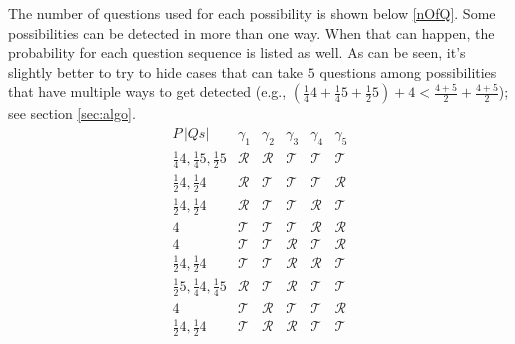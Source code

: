 \documentclass[twoside,twocolumn,a4paper,11pt]{article}
\theoremstyle{definition}
\begin{document}
The number of questions used for each possibility is shown below \eqref{nOfQ}.
Some possibilities can be detected in more than one way.
When that can happen, 
the probability for each
question sequence is listed as well.
As can be seen, it's slightly better to try to hide
cases that can take $5$ questions among possibilities that have multiple ways to get detected
(e.g., $(\frac{1}{4}4+\frac{1}{4}5+\frac{1}{2}5) + 4 < \frac{4+5}{2}+\frac{4+5}{2}$);
see section \ref{sec:algo}.
\vspace{-0.2em}
\begin{equation}
\label{nOfQ}
 \begin{matrix}
  P\,|Qs| & \gamma_1    & \gamma_2    & \gamma_3    & \gamma_4    & \gamma_5    \\
  \frac{1}{4}4,\frac{1}{4}5,\frac{1}{2}5
          & \mathcal{R} & \mathcal{R} & \mathcal{T} & \mathcal{T} & \mathcal{T} \\
  \frac{1}{2}4,\frac{1}{2}4
          & \mathcal{R} & \mathcal{T} & \mathcal{T} & \mathcal{T} & \mathcal{R} \\[1pt]
  \frac{1}{2}4,\frac{1}{2}4
          & \mathcal{R} & \mathcal{T} & \mathcal{T} & \mathcal{R} & \mathcal{T} \\
  4       & \mathcal{T} & \mathcal{T} & \mathcal{T} & \mathcal{R} & \mathcal{R} \\
  4       & \mathcal{T} & \mathcal{T} & \mathcal{R} & \mathcal{T} & \mathcal{R} \\
  \frac{1}{2}4,\frac{1}{2}4
          & \mathcal{T} & \mathcal{T} & \mathcal{R} & \mathcal{R} & \mathcal{T} \\
  \frac{1}{2}5,\frac{1}{4}4,\mathit{\frac{1}{4}5}
          & \mathcal{R} & \mathcal{T} & \mathcal{R} & \mathcal{T} & \mathcal{T} \\

  4       & \mathcal{T} & \mathcal{R} & \mathcal{T} & \mathcal{T} & \mathcal{R} \\
  \frac{1}{2}4,\frac{1}{2}4 
          & \mathcal{T} & \mathcal{R} & \mathcal{R} & \mathcal{T} & \mathcal{T} \\


\end{matrix}
\end{equation}
\end{document}
